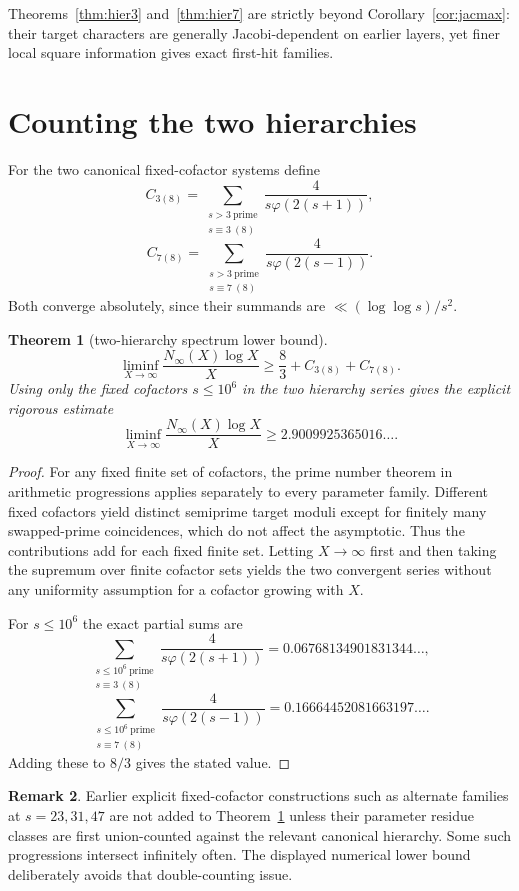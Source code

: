 \documentclass[11pt]{article}
\newtheorem{theorem}{Theorem}
\theoremstyle{definition}
\newtheorem{remark}[theorem]{Remark}
\begin{document}
Theorems~\ref{thm:hier3} and~\ref{thm:hier7} are strictly beyond Corollary~\ref{cor:jacmax}: their target characters are generally Jacobi-dependent on earlier layers, yet finer local square information gives exact first-hit families.

\section{Counting the two hierarchies}
For the two canonical fixed-cofactor systems define
\[
C_{3(8)}=
\sum_{\substack{s>3\ \mathrm{prime}\\s\equiv3\ (8)}}
\frac{4}{s\varphi(2(s+1))},
\]
\[
C_{7(8)}=
\sum_{\substack{s>3\ \mathrm{prime}\\s\equiv7\ (8)}}
\frac{4}{s\varphi(2(s-1))}.
\]
Both converge absolutely, since their summands are $\ll(\log\log s)/s^2$.

\begin{theorem}[two-hierarchy spectrum lower bound]\label{thm:count}
\[
\boxed{
\liminf_{X\to\infty}
\frac{N_\infty(X)\log X}{X}
\ge
\frac83+C_{3(8)}+C_{7(8)}.
}
\]
Using only the fixed cofactors $s\le10^6$ in the two hierarchy series gives the explicit rigorous estimate
\[
\boxed{
\liminf_{X\to\infty}
\frac{N_\infty(X)\log X}{X}
\ge2.9009925365016\ldots .
}
\]
\end{theorem}

\begin{proof}
For any fixed finite set of cofactors, the prime number theorem in arithmetic progressions applies separately to every parameter family. Different fixed cofactors yield distinct semiprime target moduli except for finitely many swapped-prime coincidences, which do not affect the asymptotic. Thus the contributions add for each fixed finite set. Letting $X\to\infty$ first and then taking the supremum over finite cofactor sets yields the two convergent series without any uniformity assumption for a cofactor growing with $X$.

For $s\le10^6$ the exact partial sums are
\[
\sum_{\substack{s\le10^6\ \mathrm{prime}\\s\equiv3\ (8)}}
\frac{4}{s\varphi(2(s+1))}
=0.06768134901831344\ldots,
\]
\[
\sum_{\substack{s\le10^6\ \mathrm{prime}\\s\equiv7\ (8)}}
\frac{4}{s\varphi(2(s-1))}
=0.16664452081663197\ldots .
\]
Adding these to $8/3$ gives the stated value.
\end{proof}

\begin{remark}
Earlier explicit fixed-cofactor constructions such as alternate families at $s=23,31,47$ are not added to Theorem~\ref{thm:count} unless their parameter residue classes are first union-counted against the relevant canonical hierarchy. Some such progressions intersect infinitely often. The displayed numerical lower bound deliberately avoids that double-counting issue.
\end{remark}
\end{document}
